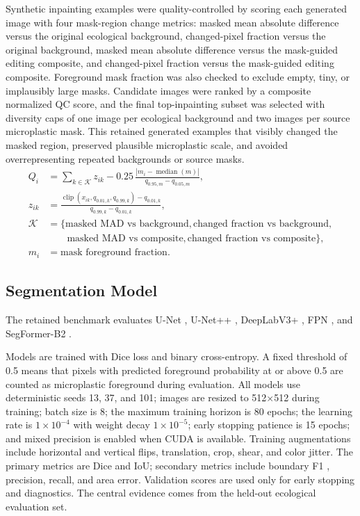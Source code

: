 \documentclass[11pt]{article}
\begin{document}
Synthetic inpainting examples were quality-controlled by scoring each generated image with four mask-region change metrics: masked mean absolute difference versus the original ecological background, changed-pixel fraction versus the original background, masked mean absolute difference versus the mask-guided editing composite, and changed-pixel fraction versus the mask-guided editing composite. Foreground mask fraction was also checked to exclude empty, tiny, or implausibly large masks. Candidate images were ranked by a composite normalized QC score, and the final top-inpainting subset was selected with diversity caps of one image per ecological background and two images per source microplastic mask. This retained generated examples that visibly changed the masked region, preserved plausible microplastic scale, and avoided overrepresenting repeated backgrounds or source masks.
\begin{equation}
\label{eq:qc-score}
\begin{aligned}
Q_i
&= \sum_{k \in \mathcal{K}} z_{ik}
   - 0.25\,
   \frac{\left|m_i - \operatorname{median}(m)\right|}
        {q_{0.95,m} - q_{0.05,m}}, \\
z_{ik}
&= \frac{\operatorname{clip}\left(x_{ik}, q_{0.01,k}, q_{0.99,k}\right)
        - q_{0.01,k}}
       {q_{0.99,k} - q_{0.01,k}}, \\
\mathcal{K}
&= \{\text{masked MAD vs background},
      \text{changed fraction vs background}, \\
&\qquad \text{masked MAD vs composite},
      \text{changed fraction vs composite}\}, \\
m_i
&= \text{mask foreground fraction}.
\end{aligned}
\end{equation}

\subsection{Segmentation Model}
The retained benchmark evaluates U-Net \cite{18}, U-Net++ \cite{19}, DeepLabV3+ \cite{20}, FPN \cite{21}, and SegFormer-B2 \cite{22}.

Models are trained with Dice loss \cite{26} and binary cross-entropy. A fixed threshold of 0.5 means that pixels with predicted foreground probability at or above 0.5 are counted as microplastic foreground during evaluation. All models use deterministic seeds 13, 37, and 101; images are resized to 512$\times$512 during training; batch size is 8; the maximum training horizon is 80 epochs; the learning rate is $1\times10^{-4}$ with weight decay $1\times10^{-5}$; early stopping patience is 15 epochs; and mixed precision is enabled when CUDA is available. Training augmentations include horizontal and vertical flips, translation, crop, shear, and color jitter. The primary metrics are Dice and IoU; secondary metrics include boundary F1 \cite{27}, precision, recall, and area error. Validation scores are used only for early stopping and diagnostics. The central evidence comes from the held-out ecological evaluation set.
\end{document}
